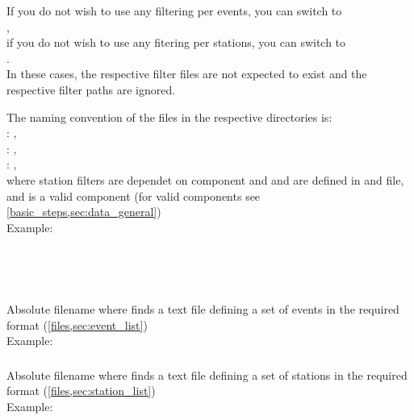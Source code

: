 If you do not wish to use any filtering per events, you can switch to\\
,\\
if you do not wish to use any fitering per stations, you can switch to\\
.\\
In these cases, the respective filter files are not expected to exist and the respective filter paths are
ignored.

The naming convention of the files in the respective directories is:\\
: ,\\
: ,\\
: , \\
where station filters are dependet on component and  and  are 
defined in  and  file, and  
is a valid component (for valid components see \ref{basic_steps,sec:data_general})\\
Example: \\
\\
\\
\\

\subsubsection{} \label{files,sec:main_parfile,itm:file_event_list}
Absolute filename where \ASKI{} finds a text file defining a set of events in the required format 
(\ref{files,sec:event_list})\\
Example: 
\subsubsection{} \label{files,sec:main_parfile,itm:file_station_list}
Absolute filename where \ASKI{} finds a text file defining a set of stations in the required format 
(\ref{files,sec:station_list})\\
Example: 
